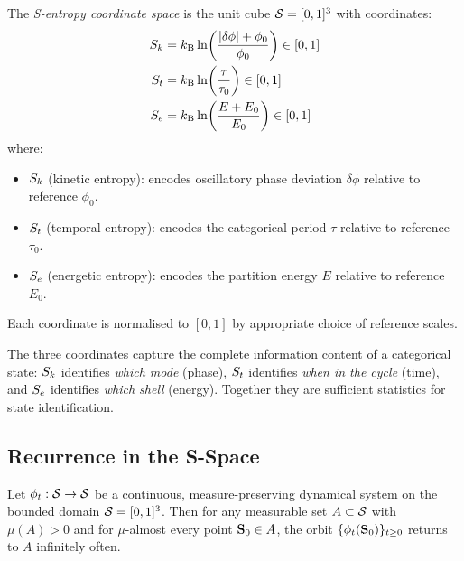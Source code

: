 \begin{definition}
\label{def:s_coords}
The \emph{S-entropy coordinate space} is the unit cube $\mathcal{S} = [0,1]^3$ with coordinates:
\begin{align}
    S_k &= k_{\mathrm{B}} \ln\!\left(\frac{|\delta\phi| + \phi_0}{\phi_0}\right) \in [0,1] \label{eq:sk} \\
    S_t &= k_{\mathrm{B}} \ln\!\left(\frac{\tau}{\tau_0}\right) \in [0,1] \label{eq:st} \\
    S_e &= k_{\mathrm{B}} \ln\!\left(\frac{E + E_0}{E_0}\right) \in [0,1] \label{eq:se}
\end{align}
where:
\begin{itemize}
    \item $S_k$ (kinetic entropy): encodes oscillatory phase deviation $\delta\phi$ relative to reference $\phi_0$.
    \item $S_t$ (temporal entropy): encodes the categorical period $\tau$ relative to reference $\tau_0$.
    \item $S_e$ (energetic entropy): encodes the partition energy $E$ relative to reference $E_0$.
\end{itemize}
Each coordinate is normalised to $[0,1]$ by appropriate choice of reference scales.
\end{definition}

\begin{remark}
The three coordinates capture the complete information content of a categorical state: $S_k$ identifies \emph{which mode} (phase), $S_t$ identifies \emph{when in the cycle} (time), and $S_e$ identifies \emph{which shell} (energy). Together they are sufficient statistics for state identification.
\end{remark}

\subsection{Recurrence in the S-Space}

\begin{theorem}
\label{thm:recurrence}
Let $\phi_t : \mathcal{S} \to \mathcal{S}$ be a continuous, measure-preserving dynamical system on the bounded domain $\mathcal{S} = [0,1]^3$. Then for any measurable set $A \subset \mathcal{S}$ with $\mu(A) > 0$ and for $\mu$-almost every point $\mathbf{S}_0 \in A$, the orbit $\{\phi_t(\mathbf{S}_0)\}_{t \geq 0}$ returns to $A$ infinitely often.
\end{theorem}


